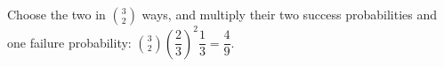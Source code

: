 Choose the two in $\binom32$ ways, and multiply their two success probabilities and one failure probability: $\binom32(\dfrac{2}{3})^2\dfrac{1}{3}=\boxed{\dfrac{4}{9}}$.
